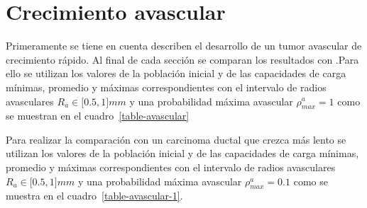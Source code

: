 \section{Crecimiento avascular}
\label{sec-avascular-results}

Primeramente se tiene en cuenta describen el desarrollo de un tumor avascular de crecimiento r\'apido. Al final de cada sección se comparan los resultados con \cite{viabarre2019}.Para ello se utilizan los valores de la poblaci\'on inicial y de las capacidades de carga m\'inimas, promedio y m\'aximas correspondientes con el intervalo de radios avasculares $R_a \in [0$.$5, 1]mm$ y una probabilidad m\'axima avascular $\rho_{max}^a=1$ como se muestran en el cuadro~\ref{table-avascular}

\begin{table}[!ht]
\begin{center}
\vspace*{-0.6cm}
\end{center}
\caption[Par\'ametros del desarrollo de un carcinoma ductal infiltrante de crecimiento r\'apido durante la etapa avascular]{Par\'ametros del desarrollo de un carcinoma ductal infiltrante de crecimiento r\'apido durante la etapa avascular.}
\label{table-avascular}
\end{table}

Para realizar la comparaci\'on con un carcinoma ductal que crezca m\'as lento se utilizan los valores de la poblaci\'on inicial y de las capacidades de carga m\'inimas, promedio y m\'aximas correspondientes con el intervalo de radios avasculares $R_a \in [0$.$5, 1]mm$ y una probabilidad m\'axima avascular $\rho_{max}^a=0$.$1$ como se muestra en el cuadro~\ref{table-avascular-1}.

